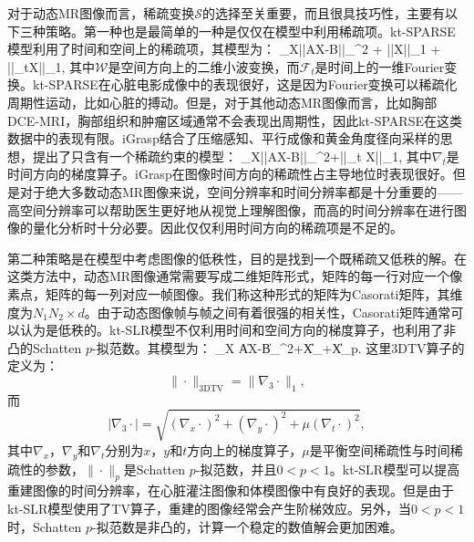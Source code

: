 对于动态MR图像而言，稀疏变换$\mathcal{S}$的选择至关重要，而且很具技巧性，主要有以下三种策略。第一种也是最简单的一种是仅仅在模型中利用稀疏项。kt-SPARSE\cite{lustig2006}模型利用了时间和空间上的稀疏项，其模型为：
\beq
\min_X||AX-B||_{}^2 + \alpha||X||_1 + \beta||_tX||_1,
\eeq
其中$\mathcal{W}$是空间方向上的二维小波变换，而$\mathcal{F}_t$是时间上的一维Fourier变换。kt-SPARSE在心脏电影成像中的表现很好，这是因为Fourier变换可以稀疏化周期性运动，比如心脏的搏动。但是，对于其他动态MR图像而言，比如胸部DCE-MRI，胸部组织和肿瘤区域通常不会表现出周期性，因此kt-SPARSE在这类数据中的表现有限。iGrasp\cite{igrasp}结合了压缩感知、平行成像和黄金角度径向采样的思想，提出了只含有一个稀疏约束的模型：
\beq
\min_X||AX-B||_{}^2+\alpha||\nabla_t X||_1,
\eeq
其中$\nabla_t$是时间方向的梯度算子。iGrasp在图像时间方向的稀疏性占主导地位时表现很好。但是对于绝大多数动态MR图像来说，空间分辨率和时间分辨率都是十分重要的——高空间分辨率可以帮助医生更好地从视觉上理解图像，而高的时间分辨率在进行图像的量化分析时十分必要。因此仅仅利用时间方向的稀疏项是不足的。

第二种策略是在模型中考虑图像的低秩性，目的是找到一个既稀疏又低秩的解。在这类方法中，动态MR图像通常需要写成二维矩阵形式，矩阵的每一行对应一个像素点，矩阵的每一列对应一帧图像。我们称这种形式的矩阵为Casorati矩阵，其维度为$N_1N_2\times d$。由于动态图像帧与帧之间有着很强的相关性，Casorati矩阵通常可以认为是低秩的。kt-SLR模型不仅利用时间和空间方向的梯度算子，也利用了非凸的Schatten $p$-拟范数。其模型为：
\beq
\min_X \|AX-B\|_{}^2+\alpha\|X\|_{}+\beta\|X\|_{p}.
\eeq
这里3DTV算子的定义为：
$$
\|\cdot\|_{\mathrm{3DTV}}=\|\nabla_3\cdot\|_1,
$$
而
$$
|\nabla_3\cdot| = \sqrt{(\nabla_x\cdot)^2+(\nabla_y\cdot)^2+\mu(\nabla_t\cdot)^2},
$$
其中$\nabla_x$，$\nabla_y$和$\nabla_t$分别为$x$，$y$和$t$方向上的梯度算子，$\mu$是平衡空间稀疏性与时间稀疏性的参数，$\|\cdot\|_{p}$是Schatten $p$-拟范数，并且$0<p<1$。kt-SLR模型可以提高重建图像的时间分辨率，在心脏灌注图像和体模图像中有良好的表现。但是由于kt-SLR模型使用了TV算子，重建的图像经常会产生阶梯效应。另外，当$0<p<1$时，Schatten $p$-拟范数是非凸的，计算一个稳定的数值解会更加困难。

